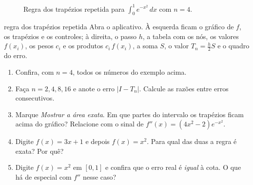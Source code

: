 \begin{figure}[h]
\centering
{}
\caption{Regra dos trapézios repetida para $\int_0^1 e^{-x^2}\,dx$ com $n=4$.}
\label{fig:trap}
\end{figure}

\begin{atividade}{regra dos trapézios repetida}{\arqTrap}
Abra o aplicativo. À esquerda ficam o gráfico de $f$, os trapézios e os controles; à
direita, o passo $h$, a tabela com os nós, os valores $f(x_i)$, os pesos $c_i$ e os produtos
$c_i\,f(x_i)$, a soma $S$, o valor $T_n=\frac h2S$ e o quadro do erro.
\begin{enumerate}[nosep]
  \item Confira, com $n=4$, todos os números do exemplo acima.
  \item Faça $n=2,4,8,16$ e anote o erro $|I-T_n|$. Calcule as razões entre erros consecutivos.
  \item Marque \emph{Mostrar a área exata}. Em que partes do intervalo os trapézios ficam acima do
        gráfico? Relacione com o sinal de $f''(x)=(4x^2-2)e^{-x^2}$.
  \item Digite $f(x)=3x+1$ e depois $f(x)=x^2$. Para qual das duas a regra é exata? Por quê?
  \item Digite $f(x)=x^2$ em $[0,1]$ e confira que o erro real é \emph{igual} à cota. O que há de
        especial com $f''$ nesse caso?
\end{enumerate}
\end{atividade}

